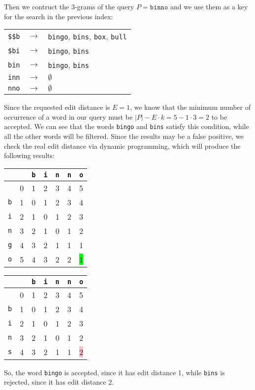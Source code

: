 %
Then we contruct the 3-grams of the query $P = \texttt{binno}$ and we use them
as a key for the search in the previous index:
%
\begin{table}[H]
  \centering
  \begin{tabular}{ccl}
    \texttt{\$\$b} & $\rightarrow$ & \texttt{bingo}, \texttt{bins},
    \texttt{box}, \texttt{bull} \\
    \texttt{\$bi} & $\rightarrow$ & \texttt{bingo}, \texttt{bins} \\
    \texttt{bin} & $\rightarrow$ & \texttt{bingo}, \texttt{bins} \\
    \texttt{inn} & $\rightarrow$ & $\emptyset$ \\
    \texttt{nno} & $\rightarrow$ & $\emptyset$ \\
  \end{tabular}
\end{table}
%
Since the requested edit distance is $E = 1$, we know that the minimum number of
occurrence of a word in our query must be $|P| - E \cdot k = 5 - 1 \cdot 3 = 2$
to be accepted. We can see that the words \texttt{bingo} and \texttt{bins}
satisfy this condition, while all the other words will be filtered. Since the
results may be a false positive, we check the real edit distance via dynamic
programming, which will produce the following results:
%
\begin{table}[H]
  \centering
  \begin{tabular}{c|c|c|c|c|c|c|}
            &   & {\tt b} & {\tt i} & {\tt n} & {\tt n} & {\tt o} \\ \hline
            & 0 &    1    &    2    &    3    &    4    &    5 \\ \hline
    {\tt b} & 1 &    0    &    1    &    2    &    3    &    4 \\ \hline
    {\tt i} & 2 &    1    &    0    &    1    &    2    &    3 \\ \hline
    {\tt n} & 3 &    2    &    1    &    0    &    1    &    2 \\ \hline
    {\tt g} & 4 &    3    &    2    &    1    &    1    &    1 \\ \hline
    {\tt o} & 5 &    4    &    3    &    2    &    2    & \colorbox{lime}{1} \\
    \hline
  \end{tabular}
  \quad\quad
  \begin{tabular}{c|c|c|c|c|c|c|}
            &   & {\tt b} & {\tt i} & {\tt n} & {\tt n} & {\tt o} \\ \hline
            & 0 &    1    &    2    &    3    &    4    &    5 \\ \hline
    {\tt b} & 1 &    0    &    1    &    2    &    3    &    4 \\ \hline
    {\tt i} & 2 &    1    &    0    &    1    &    2    &    3 \\ \hline
    {\tt n} & 3 &    2    &    1    &    0    &    1    &    2 \\ \hline
    {\tt s} & 4 &    3    &    2    &    1    &    1    & \colorbox{pink}{2} \\
    \hline
  \end{tabular}
\end{table}
%
So, the word \texttt{bingo} is accepted, since it has edit distance 1, while
\texttt{bins} is rejected, since it has edit distance 2.
